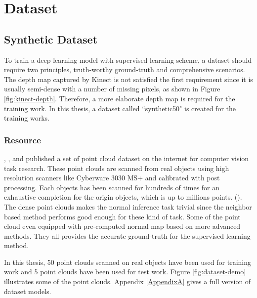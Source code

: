 
\chapter{Dataset} %

\label{ch:04} %


\section{Synthetic Dataset}
To train a deep learning model with supervised learning scheme, a dataset should require two principles, truth-worthy ground-truth and comprehensive scenarios. The depth map captured by Kinect is not satisfied the first requirement since it is usually semi-dense with a number of missing pixels, as shown in Figure \ref{fig:kinect-depth}. Therefore, a more elaborate depth map is required for the training work. In this thesis, a dataset called ``synthetic50" is created for the training works.


\subsection{Resource}
\cite{data1}, \cite{data2}, \cite{data3} and \cite{data4} published a set of point cloud dataset on the internet for computer vision task research. These point clouds are scanned from real objects using high resolution scanners like Cyberware 3030 MS+ and calibrated with post processing. Each objects has been scanned for hundreds of times for an exhaustive completion for the origin objects, which is up to millions points. (\cite{data1}). The dense point clouds makes the normal inference task trivial since the neighbor based method performs good enough for these kind of task. Some of the point cloud even equipped with pre-computed normal map based on more advanced methods. They all provides the accurate ground-truth for the supervised learning method.

In this thesis, 50 point clouds scanned on real objects have been used for training work and 5 point clouds have been used for test work. Figure \ref{fig:dataset-demo} illustrates some of the point clouds. Appendix \ref{AppendixA} gives a full version of dataset models.

